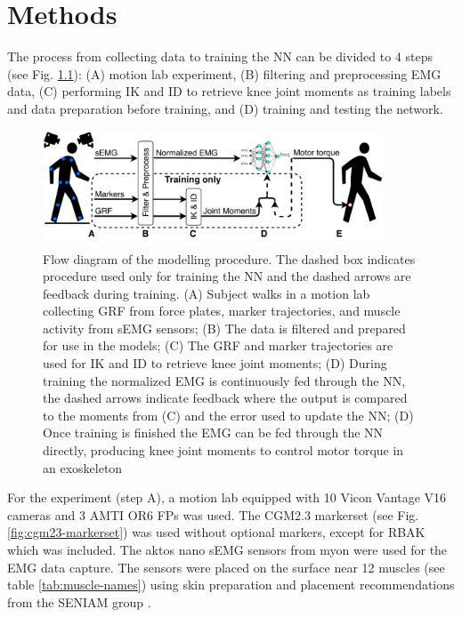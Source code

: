 \documentclass[../main.tex]{subfiles}
\begin{document}
\chapter{Methods}
\label{sec:methods}
The process from collecting data to training the \ac{NN} can be divided to 4 steps (see Fig. \ref{fig:process-diagram}): (A) motion lab experiment, (B) filtering and preprocessing EMG data, (C) performing \ac{IK} and \ac{ID} to retrieve knee joint moments as training labels and data preparation before training, and (D) training and testing the network.

\begin{figure}[ht]
    \centering
    \includegraphics[width=0.9\textwidth]{img/ProcessDiagram}
    \caption{Flow diagram of the modelling procedure. The dashed box indicates procedure used only for training the \ac{NN} and the dashed arrows are feedback during training. (A) Subject walks in a motion lab collecting \ac{GRF} from force plates, marker trajectories, and muscle activity from \ac{sEMG} sensors; (B) The data is filtered and prepared for use in the models; (C) The \ac{GRF} and marker trajectories are used for \ac{IK} and \ac{ID} to retrieve knee joint moments; (D) During training the normalized \ac{EMG} is continuously fed through the \ac{NN}, the dashed arrows indicate feedback where the output is compared to the moments from (C) and the error used to update the \ac{NN}; (D) Once training is finished the \ac{EMG} can be fed through the \ac{NN} directly, producing knee joint moments to control motor torque in an exoskeleton}
    \label{fig:process-diagram}
\end{figure}

For the experiment (step A), a motion lab equipped with 10 Vicon Vantage V16 cameras and 3 AMTI OR6 \acp{FP} was used. 
The CGM2.3 markerset \textcite{Leboeuf2019} (see Fig. \ref{fig:cgm23-markerset}) was used without optional markers, except for RBAK which was included.
The aktos nano \ac{sEMG} sensors from myon were used for the \ac{EMG} data capture. 
The sensors were placed on the surface near 12 muscles (see table \ref{tab:muscle-names}) using skin preparation and placement recommendations from the SENIAM group \cite{Hermens1999, Hermens2000}.
\end{document}
